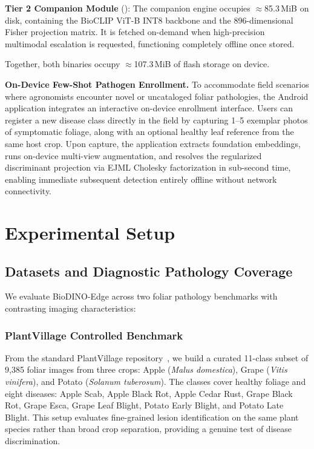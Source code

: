 \documentclass[preprint,12pt]{elsarticle}
\begin{document}
\textbf{Tier 2 Companion Module} (): The companion engine occupies $\approx$85.3\,MiB on disk, containing the BioCLIP ViT-B INT8 backbone and the 896-dimensional Fisher projection matrix. It is fetched on-demand when high-precision multimodal escalation is requested, functioning completely offline once stored.

Together, both binaries occupy $\approx$107.3\,MiB of flash storage on device.

\textbf{On-Device Few-Shot Pathogen Enrollment.} To accommodate field scenarios where agronomists encounter novel or uncataloged foliar pathologies, the Android application integrates an interactive on-device enrollment interface. Users can register a new disease class directly in the field by capturing 1--5 exemplar photos of symptomatic foliage, along with an optional healthy leaf reference from the same host crop. Upon capture, the application extracts foundation embeddings, runs on-device multi-view augmentation, and resolves the regularized discriminant projection via EJML Cholesky factorization in sub-second time, enabling immediate subsequent detection entirely offline without network connectivity.



\section{Experimental Setup}
\label{sec:experiments_setup}

\subsection{Datasets and Diagnostic Pathology Coverage}
\label{sec:datasets}
We evaluate BioDINO-Edge across two foliar pathology benchmarks with contrasting imaging characteristics:

\subsubsection{PlantVillage Controlled Benchmark}
From the standard PlantVillage repository~\cite{hughes2012plantvillage}, we build a curated 11-class subset of 9,385 foliar images from three crops: Apple (\textit{Malus domestica}), Grape (\textit{Vitis vinifera}), and Potato (\textit{Solanum tuberosum}). The classes cover healthy foliage and eight diseases: Apple Scab, Apple Black Rot, Apple Cedar Rust, Grape Black Rot, Grape Esca, Grape Leaf Blight, Potato Early Blight, and Potato Late Blight. This setup evaluates fine-grained lesion identification on the same plant species rather than broad crop separation, providing a genuine test of disease discrimination.
\end{document}

